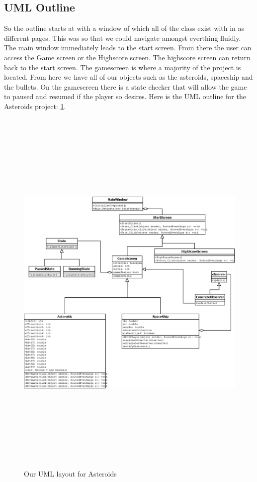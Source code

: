 \documentclass[10pt,conference,onecolumn,compsoc]{IEEEtran}
\begin{document}
\subsection{UML Outline}
So the outline starts at with a window of which all of the class exist with in as different pages. This was so that we could navigate amongst everthing fluidly. The main window immediately leads to the start screen. From there the user can access the Game screen or the Highscore screen. The highscore screen can return back to the start screen. The gamescreen is where a majority of the project is located. From here we have all of our objects such as the asteroids, spaceship and the bullets. On the gamescreen there is a state checker that will allow the game to paused and resumed if the player so desires. 
Here is the UML outline for the Asteroids project: \ref{AsteroidsDia}.
\begin{figure}[ht!]
\includegraphics[height=700px, width=500px]{AsteroidsUML.png}
\caption{Our UML layout for Asteroids}
\label{AsteroidsDia}
\end{figure}
\end{document}
